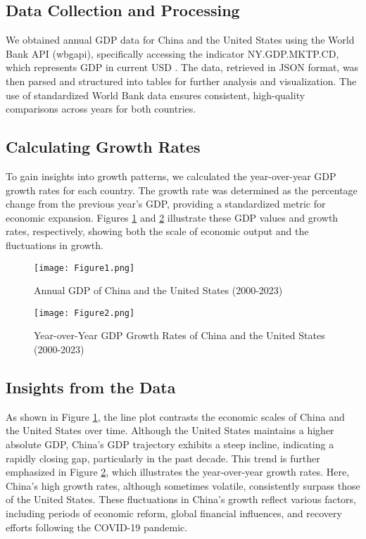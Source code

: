 \documentclass{article}
\begin{document}
\subsection{Data Collection and Processing}

We obtained annual GDP data for China and the United States using the World Bank API (wbgapi), specifically accessing the indicator NY.GDP.MKTP.CD, which represents GDP in current USD \cite{worldbank}. The data, retrieved in JSON format, was then parsed and structured into tables for further analysis and visualization. The use of standardized World Bank data ensures consistent, high-quality comparisons across years for both countries.

\subsection{Calculating Growth Rates}

To gain insights into growth patterns, we calculated the year-over-year GDP growth rates for each country. The growth rate was determined as the percentage change from the previous year’s GDP, providing a standardized metric for economic expansion. Figures \ref{fig1} and \ref{fig2} illustrate these GDP values and growth rates, respectively, showing both the scale of economic output and the fluctuations in growth.

\begin{figure}[H]
    \centering
    \texttt{[image: Figure1.png]}
    \caption{Annual GDP of China and the United States (2000-2023)}
    \label{fig1}
\end{figure}

\begin{figure}[H]
    \centering
    \texttt{[image: Figure2.png]}
    \caption{Year-over-Year GDP Growth Rates of China and the United States (2000-2023)} \label{fig2}
\end{figure}

\subsection{Insights from the Data}

As shown in Figure \ref{fig1}, the line plot contrasts the economic scales of China and the United States over time. Although the United States maintains a higher absolute GDP, China’s GDP trajectory exhibits a steep incline, indicating a rapidly closing gap, particularly in the past decade. This trend is further emphasized in Figure \ref{fig2}, which illustrates the year-over-year growth rates. Here, China’s high growth rates, although sometimes volatile, consistently surpass those of the United States. These fluctuations in China's growth reflect various factors, including periods of economic reform, global financial influences, and recovery efforts following the COVID-19 pandemic.
\end{document}
